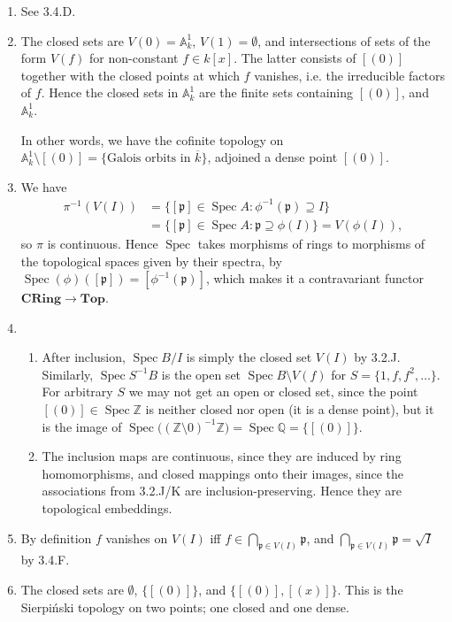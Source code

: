 \documentclass{report}
\newcommand{\cat}[1]{\mathbf{#1}} %
\newcommand{\rad}[1]{\sqrt{#1}} %
\newcommand{\closure}[1]{\overline{#1}} %
\newcommand{\p}{\mathfrak{p}}
\newcommand{\A}{\mathbb{A}}
\newcommand{\Z}{\mathbb{Z}}
\newcommand{\Q}{\mathbb{Q}}
\DeclareMathOperator{\Spec}{Spec}
\begin{document}
\begin{enumerate}[label=\textbf{3.4.\Alph*.}]
	\item See 3.4.D.

	\item The closed sets are $V(0)=\A^1_k$, $V(1)=\emptyset$, and intersections
	      of sets of the form $V(f)$ for non-constant $f\in k[x]$. The latter
	      consists of $[(0)]$ together with the closed points at which $f$
	      vanishes, i.e. the irreducible factors of $f$. Hence the closed sets in
	      $\A^1_k$ are the finite sets containing $[(0)]$, and $\A^1_k$.

	      In other words, we have the cofinite topology on
	      $\A^1_k\setminus[(0)]=\{\text{Galois orbits in $\closure k$}\}$,
	      adjoined a dense point $[(0)]$.

	\item We have
	      \begin{align*}
		      \pi^{-1}(V(I))
		       & = \{[\p]\in\Spec A:\phi^{-1}(\p)\supseteq I\} \\
		       & = \{[\p]\in\Spec A:\p\supseteq\phi(I)\}
		      = V(\phi(I)),
	      \end{align*}
	      so $\pi$ is continuous. Hence $\Spec$ takes morphisms of rings to
	      morphisms of the topological spaces given by their spectra, by
	      $\Spec(\phi)([\p])=[\phi^{-1}(\p)]$, which makes it a contravariant
	      functor $\cat{CRing}\to\cat{Top}$.

	\item
	      \begin{enumerate}[label=(\alph*)]
		      \item After inclusion, $\Spec B/I$ is simply the closed set $V(I)$
		            by 3.2.J. Similarly, $\Spec S^{-1}B$ is the open set
		            $\Spec B\setminus V(f)$ for $S=\{1,f,f^2,\ldots\}$. For
		            arbitrary $S$ we may not get an open or closed set, since the
		            point $[(0)]\in\Spec\Z$ is neither closed nor open (it is a
		            dense point), but it is the image of
		            $\Spec\bigl((\Z\setminus0)^{-1}\Z\bigr)=\Spec\Q=\{[(0)]\}$.

		      \item The inclusion maps are continuous, since they are induced by
		            ring homomorphisms, and closed mappings onto their images,
		            since the associations from 3.2.J/K are inclusion-preserving.
		            Hence they are topological embeddings.
	      \end{enumerate}

	\item By definition $f$ vanishes on $V(I)$ iff $f\in\bigcap_{\p\in V(I)}\p$,
	      and $\bigcap_{\p\in V(I)}\p=\rad I$ by 3.4.F.

	\item The closed sets are $\emptyset$, $\bigl\{[(0)]\bigr\}$, and
	      $\bigl\{[(0)],[(x)]\bigr\}$. This is the Sierpi\'nski topology on two
	      points; one closed and one dense.
\end{enumerate}
\end{document}
